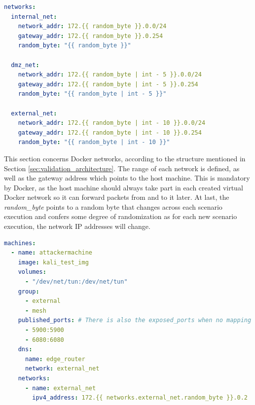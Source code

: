 \begin{lstlisting}[language=yaml,caption=Ansible Variables - Docker Networks.,numbers=none,label={lst:ansible_vars_2}]
networks:
  internal_net:
    network_addr: 172.{{ random_byte }}.0.0/24
    gateway_addr: 172.{{ random_byte }}.0.254
    random_byte: "{{ random_byte }}"

  dmz_net:
    network_addr: 172.{{ random_byte | int - 5 }}.0.0/24
    gateway_addr: 172.{{ random_byte | int - 5 }}.0.254
    random_byte: "{{ random_byte | int - 5 }}"

  external_net:
    network_addr: 172.{{ random_byte | int - 10 }}.0.0/24
    gateway_addr: 172.{{ random_byte | int - 10 }}.0.254
    random_byte: "{{ random_byte | int - 10 }}"
\end{lstlisting}

This section concerns Docker networks, according to the structure mentioned in Section \ref{sec:validation_architecture}. The range of each network is defined, as well as the gateway address which points to the host machine. This is mandatory by Docker, as the host machine should always take part in each created virtual Docker network so it can forward packets from and to it later. At last, the \textit{random\_byte} points to a random byte that changes across each scenario execution and confers some degree of randomization as for each new scenario execution, the network IP addresses will change. 

\begin{lstlisting}[language=yaml,caption=Ansible Variables - Machines.,numbers=none,label={lst:ansible_vars_3}]
machines:
  - name: attackermachine
    image: kali_test_img
    volumes:
      - "/dev/net/tun:/dev/net/tun"
    group:
      - external
      - mesh
    published_ports: # There is also the exposed_ports when no mapping to the host machine is needed 
      - 5900:5900
      - 6080:6080
    dns: 
      name: edge_router
      network: external_net
    networks:
      - name: external_net
        ipv4_address: 172.{{ networks.external_net.random_byte }}.0.2
\end{lstlisting}

